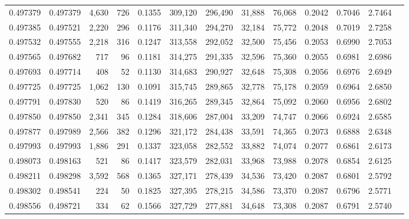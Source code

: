 \begin{tabular}{rrrrrrrrrrrrr}
0.497379 & 0.497379 & 4,630 &   726 &                                     0.1355 & 309,120 & 296,490 &  31,888 &  76,068 & 0.2042 & 0.7046 & 2.7464 \\
0.497385 & 0.497521 & 2,220 &   296 &                                     0.1176 & 311,340 & 294,270 &  32,184 &  75,772 & 0.2048 & 0.7019 & 2.7258 \\
0.497532 & 0.497555 & 2,218 &   316 &                                     0.1247 & 313,558 & 292,052 &  32,500 &  75,456 & 0.2053 & 0.6990 & 2.7053 \\
0.497565 & 0.497682 &   717 &    96 &                                     0.1181 & 314,275 & 291,335 &  32,596 &  75,360 & 0.2055 & 0.6981 & 2.6986 \\
0.497693 & 0.497714 &   408 &    52 &                                     0.1130 & 314,683 & 290,927 &  32,648 &  75,308 & 0.2056 & 0.6976 & 2.6949 \\
0.497725 & 0.497725 & 1,062 &   130 &                                     0.1091 & 315,745 & 289,865 &  32,778 &  75,178 & 0.2059 & 0.6964 & 2.6850 \\
0.497791 & 0.497830 &   520 &    86 &                                     0.1419 & 316,265 & 289,345 &  32,864 &  75,092 & 0.2060 & 0.6956 & 2.6802 \\
0.497850 & 0.497850 & 2,341 &   345 &                                     0.1284 & 318,606 & 287,004 &  33,209 &  74,747 & 0.2066 & 0.6924 & 2.6585 \\
0.497877 & 0.497989 & 2,566 &   382 &                                     0.1296 & 321,172 & 284,438 &  33,591 &  74,365 & 0.2073 & 0.6888 & 2.6348 \\
0.497993 & 0.497993 & 1,886 &   291 &                                     0.1337 & 323,058 & 282,552 &  33,882 &  74,074 & 0.2077 & 0.6861 & 2.6173 \\
0.498073 & 0.498163 &   521 &    86 &                                     0.1417 & 323,579 & 282,031 &  33,968 &  73,988 & 0.2078 & 0.6854 & 2.6125 \\
0.498211 & 0.498298 & 3,592 &   568 &                                     0.1365 & 327,171 & 278,439 &  34,536 &  73,420 & 0.2087 & 0.6801 & 2.5792 \\
0.498302 & 0.498541 &   224 &    50 &                                     0.1825 & 327,395 & 278,215 &  34,586 &  73,370 & 0.2087 & 0.6796 & 2.5771 \\
0.498556 & 0.498721 &   334 &    62 &                                     0.1566 & 327,729 & 277,881 &  34,648 &  73,308 & 0.2087 & 0.6791 & 2.5740 \\

\end{tabular}
